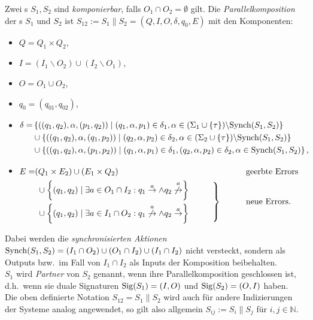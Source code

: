 \begin{Def}[Parallelkomposition]
\label{DefParallelkomposition}
  Zwei \EIO{}s $S_1, S_2$ sind \emph{komponierbar}, falls
  $O_1\cap O_2=\emptyset$ gilt. Die \emph{Parallelkomposition} der \EIO{}s
  $S_1$ und $S_2$ ist
  $S_{12}:=S_1\|S_2=(Q,I,O,\delta ,q_0,E)$ mit den Komponenten:
  \begin{itemize}
    \item $Q=Q_1\times Q_2$,
    \item $I=(I_1\backslash O_2)\cup(I_2\backslash O_1)$,
    \item $O=O_1\cup O_2$,
    \item $q_0=(q_{01},q_{02})$,
    \item $\begin{aligned}[t]
    \delta =&\left\{((q_1,q_2),\alpha ,(p_1,q_2))\mid (q_1,\alpha ,p_1)\in\delta
      _1,\alpha\in(\Sigma _1\cup\{\tau\})\backslash \mathrm{Synch}(S_1,S_2)\right\}\\
      &\cup\left\{((q_1,q_2),\alpha ,(q_1,p_2))\mid (q_2,\alpha ,p_2)\in\delta
      _2,\alpha\in(\Sigma _2\cup\{\tau\})\backslash \mathrm{Synch}(S_1,S_2)\right\}\\
      &\cup\left\{((q_1,q_2),\alpha ,(p_1,p_2))\mid (q_1,\alpha ,p_1)\in\delta
      _1, (q_2,\alpha ,p_2)\in\delta _2, \alpha\in \mathrm{Synch}(S_1,S_2)\right\},
  \end{aligned}$
    \item $\begin{aligned}[t]
        E=&(Q_1\times E_2)\cup (E_1\times Q_2)
        &&\phantom{neue}\mathrm{geerbte}~\mathrm{Errors}\\
        &\left.\begin{aligned}
        &\cup\left\{(q_1,q_2)\mid \exists a\in O_1\cap I_2: q_1\overset{a}{\rightarrow}\wedge
      q_2\overset{a}{\not{\hspace{-0.1cm}\rightarrow}}\right\}\\
      &\cup\left\{(q_1,q_2)\mid \exists a\in I_1\cap O_2:
q_1\overset{a}{\not{\hspace{-0.1cm}\rightarrow}}\wedge
q_2\overset{a}{\rightarrow}\right\}
\end{aligned}\hspace{1cm}\right\}
      &&\phantom{neue}\mathrm{neue}~\mathrm{Errors}.\\
  \end{aligned}$
  \end{itemize}
  Dabei werden die \emph{synchronisierten Aktionen} $\mathrm{Synch}(S_1,
  S_2)=(I_1\cap O_2)\cup(O_1\cap I_2)\cup (I_1\cap I_2)$ nicht versteckt,
  sondern als Outputs bzw.\ im Fall von $I_1\cap I_2$ als Inputs der
  Komposition beibehalten.\\
  $S_1$ wird \emph{Partner} von $S_2$ genannt, wenn ihre
  Parallelkomposition geschlossen ist, d.h.\ wenn sie duale Signaturen
  $\mathrm{Sig}(S_1)=(I,O)$ und $\mathrm{Sig}(S_2)=(O,I)$ haben.\\
  Die oben definierte Notation $S_{12}=S_1\|S_2$ wird auch für andere
  Indizierungen der Systeme analog angewendet, so gilt also allgemein
  $S_{ij}:=S_i\|S_j$ für $i,j\in\mathbb{N}$.
\end{Def}

